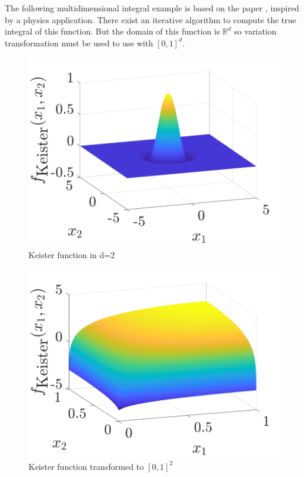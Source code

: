 \documentclass[twocolumn]{svjour3}          %
\newcommand{\reals}{\mathbb{R}}
\begin{document}
\begin{enumerate}
The following multidimensional integral example is based on the paper \cite{KeisterExample}, inspired by a physics application. There exist an iterative algorithm to compute the true integral of this function. But the domain of this function is $\reals^d$ so variation transformation must be used to use with $[0,1]^d$.
\begin{figure}
	\centering
	\includegraphics[width=0.95\linewidth]{"figures/Keister_wholeR"}
	\caption[Guaranteed:]{Keister function in d=2}
	\label{fig:keister-R}
\end{figure}

\begin{figure}
	\centering
	\includegraphics[width=0.95\linewidth]{"figures/Keister_cube_0_1"}
	\caption[Guaranteed:]{Keister function transformed to $[0,1]^2$}
	\label{fig:keister-0_1}
\end{figure}



\end{enumerate}
\end{document}
